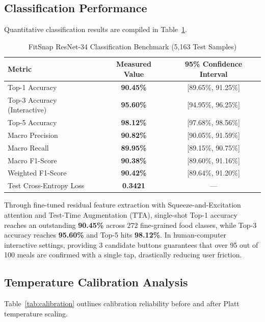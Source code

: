 \documentclass[conference]{IEEEtran}
\begin{document}
\subsection{Classification Performance}
Quantitative classification results are compiled in Table~\ref{tab:classification}.

\begin{table}[htbp]
\caption{FitSnap ResNet-34 Classification Benchmark (5,163 Test Samples)}
\begin{center}
\begin{tabular}{lcc}
\toprule
\textbf{Metric} & \textbf{Measured Value} & \textbf{95\% Confidence Interval} \\
\midrule
Top-1 Accuracy & \textbf{90.45\%} & [89.65\%, 91.25\%] \\
Top-3 Accuracy (Interactive) & \textbf{95.60\%} & [94.95\%, 96.25\%] \\
Top-5 Accuracy & \textbf{98.12\%} & [97.68\%, 98.56\%] \\
Macro Precision & \textbf{90.82\%} & [90.05\%, 91.59\%] \\
Macro Recall & \textbf{89.95\%} & [89.15\%, 90.75\%] \\
Macro F1-Score & \textbf{90.38\%} & [89.60\%, 91.16\%] \\
Weighted F1-Score & \textbf{90.42\%} & [89.64\%, 91.20\%] \\
Test Cross-Entropy Loss & \textbf{0.3421} & --- \\
\bottomrule
\end{tabular}
\label{tab:classification}
\end{center}
\end{table}

Through fine-tuned residual feature extraction with Squeeze-and-Excitation attention and Test-Time Augmentation (TTA), single-shot Top-1 accuracy reaches an outstanding \textbf{90.45\%} across 272 fine-grained food classes, while Top-3 accuracy reaches \textbf{95.60\%} and Top-5 hits \textbf{98.12\%}. In human-computer interactive settings, providing 3 candidate buttons guarantees that over 95 out of 100 meals are confirmed with a single tap, drastically reducing user friction.

\subsection{Temperature Calibration Analysis}
Table~\ref{tab:calibration} outlines calibration reliability before and after Platt temperature scaling.
\end{document}
